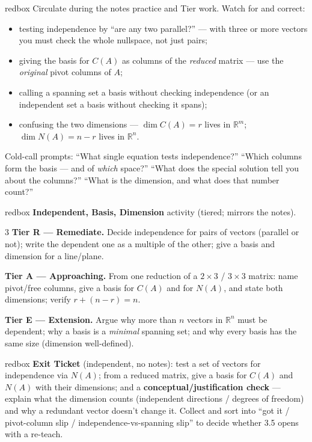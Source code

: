 \documentclass[10pt]{article}
\begin{document}
\begin{skillbox}{redbox}
Circulate during the notes practice and Tier work. Watch for and correct:
\begin{itemize}[leftmargin=1.2em, nosep]
  \item testing independence by ``are any two parallel?'' --- with three or more vectors you must check the whole nullspace, not just pairs;
  \item giving the basis for $C(A)$ as columns of the \emph{reduced} matrix --- use the \emph{original} pivot columns of $A$;
  \item calling a spanning set a basis without checking independence (or an independent set a basis without checking it spans);
  \item confusing the two dimensions --- $\dim C(A)=r$ lives in $\mathbb{R}^m$; $\dim N(A)=n-r$ lives in $\mathbb{R}^n$.
\end{itemize}
Cold-call prompts: ``What single equation tests independence?'' ``Which columns form the basis --- and of
\emph{which} space?'' ``What does the special solution tell you about the columns?'' ``What is the
dimension, and what does that number count?''
\end{skillbox}

\begin{skillbox}{redbox}
\textbf{Independent, Basis, Dimension} activity (tiered; mirrors the notes).
\begin{multicols}{3}
\textbf{Tier R --- Remediate.} Decide independence for pairs of vectors (parallel or not); write the
dependent one as a multiple of the other; give a basis and dimension for a line/plane.

\columnbreak
\textbf{Tier A --- Approaching.} From one reduction of a $2\times3$ / $3\times3$ matrix: name pivot/free
columns, give a basis for $C(A)$ and for $N(A)$, and state both dimensions; verify $r+(n-r)=n$.

\columnbreak
\textbf{Tier E --- Extension.} Argue why more than $n$ vectors in $\mathbb{R}^n$ must be dependent; why a
basis is a \emph{minimal} spanning set; and why every basis has the same size (dimension well-defined).
\end{multicols}
\end{skillbox}

\begin{skillbox}{redbox}
\textbf{Exit Ticket} (independent, no notes): test a set of vectors for independence via $N(A)$; from a
reduced matrix, give a basis for $C(A)$ and $N(A)$ with their dimensions; and a
\textbf{conceptual/justification check} --- explain what the dimension counts (independent directions /
degrees of freedom) and why a redundant vector doesn't change it. Collect and sort into ``got it /
pivot-column slip / independence-vs-spanning slip'' to decide whether 3.5 opens with a re-teach.
\end{skillbox}
\end{document}
